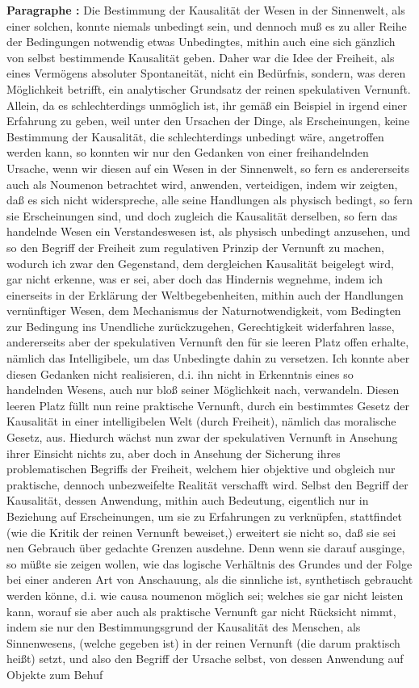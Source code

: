 \documentclass[a4paper,12pt,twoside]{book}
\begin{document}
	\noindent\textbf{Paragraphe : }
	Die Bestimmung der Kausalität der Wesen in der Sinnenwelt, als einer solchen, konnte niemals unbedingt sein, und dennoch muß es zu aller Reihe der Bedingungen notwendig etwas Unbedingtes, mithin auch eine sich gänzlich von selbst bestimmende Kausalität geben. Daher war die Idee der Freiheit, als eines Vermögens absoluter Spontaneität, nicht ein Bedürfnis, sondern, was deren Möglichkeit betrifft, ein analytischer Grundsatz der reinen spekulativen Vernunft. Allein, da es schlechterdings unmöglich ist, ihr gemäß ein Beispiel in irgend einer Erfahrung zu geben, weil unter den Ursachen der Dinge, als Erscheinungen, keine Bestimmung der Kausalität, die schlechterdings unbedingt wäre, angetroffen werden kann, so konnten wir nur den Gedanken von einer freihandelnden Ursache, wenn wir diesen auf ein Wesen in der Sinnenwelt, so fern es andererseits auch als Noumenon betrachtet wird, anwenden, verteidigen, indem wir zeigten, daß es sich nicht widerspreche, alle seine Handlungen als physisch bedingt, so fern sie Erscheinungen sind, und doch zugleich die Kausalität derselben, so fern das handelnde Wesen ein Verstandeswesen ist, als physisch unbedingt anzusehen, und so den Begriff der Freiheit zum regulativen Prinzip der Vernunft zu machen, wodurch ich zwar den Gegenstand, dem dergleichen Kausalität beigelegt wird, gar nicht erkenne, was er sei, aber doch das Hindernis wegnehme, indem ich einerseits in der Erklärung der Weltbegebenheiten, mithin auch der Handlungen vernünftiger Wesen, dem Mechanismus der Naturnotwendigkeit, vom Bedingten zur Bedingung ins Unendliche zurückzugehen, Gerechtigkeit widerfahren lasse, andererseits aber der spekulativen Vernunft den für sie leeren Platz offen erhalte, nämlich das Intelligibele, um das Unbedingte dahin zu versetzen. Ich konnte aber diesen Gedanken nicht realisieren, d.i. ihn nicht in Erkenntnis eines so handelnden Wesens, auch nur bloß seiner Möglichkeit nach, verwandeln. Diesen leeren Platz füllt nun reine praktische Vernunft, durch ein bestimmtes Gesetz der Kausalität in einer intelligibelen Welt (durch Freiheit), nämlich das moralische Gesetz, aus. Hiedurch wächst nun zwar der  spekulativen Vernunft in Ansehung ihrer Einsicht nichts zu, aber doch in Ansehung der Sicherung ihres problematischen Begriffs der Freiheit, welchem hier objektive und obgleich nur praktische, dennoch unbezweifelte Realität verschafft wird. Selbst den Begriff der Kausalität, dessen Anwendung, mithin auch Bedeutung, eigentlich nur in Beziehung auf Erscheinungen, um sie zu Erfahrungen zu verknüpfen, stattfindet (wie die Kritik der reinen Vernunft beweiset,) erweitert sie nicht so, daß sie sei nen Gebrauch über gedachte Grenzen ausdehne. Denn wenn sie darauf ausginge, so müßte sie zeigen wollen, wie das logische Verhältnis des Grundes und der Folge bei einer anderen Art von Anschauung, als die sinnliche ist, synthetisch gebraucht werden könne, d.i. wie causa noumenon möglich sei; welches sie gar nicht leisten kann, worauf sie aber auch als praktische Vernunft gar nicht Rücksicht nimmt, indem sie nur den Bestimmungsgrund der Kausalität des Menschen, als Sinnenwesens, (welche gegeben ist) in der reinen Vernunft (die darum praktisch heißt) setzt, und also den Begriff der Ursache selbst, von dessen Anwendung auf Objekte zum Behuf 
\end{document}
